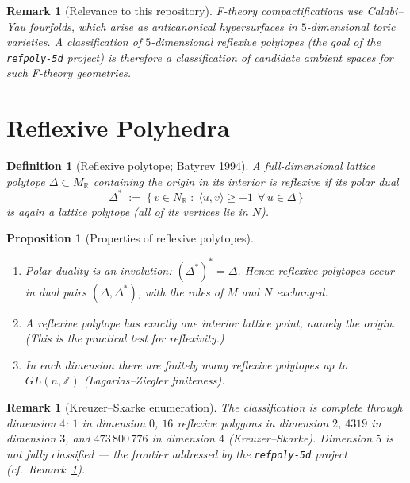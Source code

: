 \documentclass{amsart}
\newtheorem{proposition}[theorem]{Proposition}
\newtheorem{definition}[theorem]{Definition}
\newtheorem{remark}[theorem]{Remark}
\begin{document}
\begin{remark}[Relevance to this repository]\label{rmk:repo}
F-theory compactifications use Calabi--Yau \emph{fourfolds}, which arise
as anticanonical hypersurfaces in $5$-dimensional toric varieties. A
classification of $5$-dimensional reflexive polytopes (the goal of the
\texttt{refpoly-5d} project) is therefore a classification of candidate
ambient spaces for such F-theory geometries.
\end{remark}

\section{Reflexive Polyhedra}

\begin{definition}[Reflexive polytope; Batyrev 1994]\label{def:reflexive}
A full-dimensional lattice polytope $\Delta \subset M_{\mathbb{R}}$
containing the origin in its interior is \emph{reflexive} if its
\emph{polar dual}
\begin{equation}
  \Delta^* \;:=\; \bigl\{\, v \in N_{\mathbb{R}} \;:\;
  \langle u,v\rangle \geq -1 \ \ \forall\, u \in \Delta \,\bigr\}
\end{equation}
is again a lattice polytope (all of its vertices lie in $N$).
\end{definition}

\begin{proposition}[Properties of reflexive polytopes]\label{prop:reflexive}
\leavevmode
\begin{enumerate}
  \item Polar duality is an involution: $(\Delta^*)^* = \Delta$. Hence
        reflexive polytopes occur in \emph{dual pairs} $(\Delta,\Delta^*)$,
        with the roles of $M$ and $N$ exchanged.
  \item A reflexive polytope has \emph{exactly one} interior lattice point,
        namely the origin. (This is the practical test for reflexivity.)
  \item In each dimension there are finitely many reflexive polytopes up to
        $GL(n,\mathbb{Z})$ (Lagarias--Ziegler finiteness).
\end{enumerate}
\end{proposition}

\begin{remark}[Kreuzer--Skarke enumeration]
The classification is complete through dimension $4$:
$1$ in dimension $0$, $16$ reflexive polygons in dimension $2$,
$4319$ in dimension $3$, and $473\,800\,776$ in dimension $4$
(Kreuzer--Skarke). Dimension $5$ is \emph{not} fully classified --- the
frontier addressed by the \texttt{refpoly-5d} project (cf.\
Remark~\ref{rmk:repo}).
\end{remark}
\end{document}
